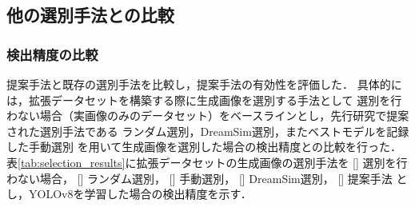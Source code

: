 \documentclass[Japanese]{dicomopapers}
\begin{document}
  \subsection{他の選別手法との比較}
    \subsubsection{検出精度の比較}

    提案手法と既存の選別手法を比較し，提案手法の有効性を評価した．
    具体的には，拡張データセットを構築する際に生成画像を選別する手法として
    選別を行わない場合（実画像のみのデータセット）をベースラインとし，先行研究で提案された選別手法である
    ランダム選別，DreamSim選別，またベストモデルを記録した手動選別
    を用いて生成画像を選別した場合の検出精度との比較を行った．
    表\ref{tab:selection_results}に拡張データセットの生成画像の選別手法を
    [] 選別を行わない場合，
    [] ランダム選別，
    [] 手動選別，
    [] DreamSim選別，
    [] 提案手法
    とし，YOLOv8を学習した場合の検出精度を示す．
\end{document}
